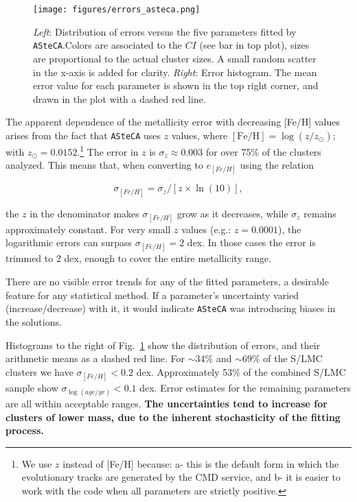 \documentclass{aa}
\begin{document}
\begin{figure}[!ht]
\centering
\texttt{[image: figures/errors\_asteca.png]}
\caption{\emph{Left}: Distribution of errors versus the five parameters fitted
by \texttt{ASteCA}.\@ Colors are associated to the $CI$ (see bar in top plot),
sizes are proportional to the actual cluster sizes. A small random scatter in
the x-axis is added for clarity.
\emph{Right}: Error histogram. The mean error value for each parameter is shown
in the top right corner, and drawn in the plot with a dashed red line.}
\label{fig:errors}
\end{figure}

The apparent dependence of the metallicity error with decreasing [Fe/H] values
arises from the fact that \texttt{ASteCA} uses $z$ values, where
$\mathrm{[Fe/H]}{=}\log(z/z_{\odot})$; with $z_{\odot}{=}0.0152$.\footnote{
We use $z$ instead of [Fe/H] because: a- this is the default form in
which the evolutionary tracks are generated by the CMD service, and b- it is
easier to work with the code when all parameters are strictly positive.}
The error in $z$ is $\sigma_z{\approx}0.003$ for over 75\% of the clusters
analyzed. This means that, when converting to $e_{[Fe/H]}$ using the relation

\begin{equation}
\sigma_{[Fe/H]} = \sigma_z/[z\times\ln(10)],
\end{equation}

\noindent the $z$ in the denominator makes $\sigma_{[Fe/H]}$ grow as it
decreases, while $\sigma_z$ remains approximately constant.
For very small $z$ values (e.g.: $z{=}0.0001$), the logarithmic errors can
surpass $\sigma_{[Fe/H]}{=}2$ dex. In those cases the error is trimmed to 2 dex,
enough to cover the entire metallicity range.

There are no visible error trends for any of the fitted parameters, a desirable
feature for any statistical method. If a parameter's uncertainty varied 
(increase/decrease) with it, it would indicate \texttt{ASteCA} was
introducing biases in the solutions.

Histograms to the right of Fig.~\ref{fig:errors} show the distribution
of errors, and their arithmetic means as a dashed red line.
For $\sim$34\% and ${\sim}69\%$ of the S/LMC clusters we have
$\sigma_{[Fe/H]}{<}0.2$ dex.
Approximately 53\% of the combined S/LMC sample show
$\sigma_{\log(age/yr)}{<}0.1$ dex. Error estimates for the remaining parameters
are all within acceptable ranges. \textbf{The uncertainties tend to increase for
clusters of lower mass, due to the inherent stochasticity of the fitting
process.}\\
\end{document}
